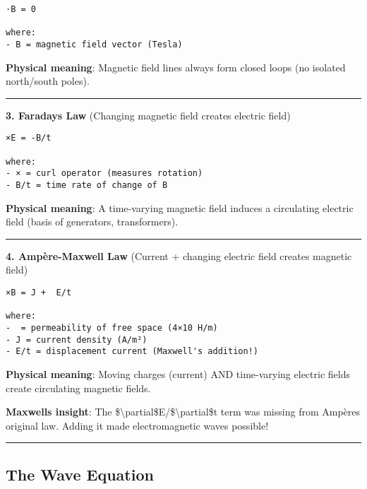 \begin{verbatim}
·B = 0

where:
- B = magnetic field vector (Tesla)
\end{verbatim}

\textbf{Physical meaning}: Magnetic field lines always form closed loops
(no isolated north/south poles).

\begin{center}\rule{0.5\linewidth}{0.5pt}\end{center}

\textbf{3. Faraday\textquotesingle s Law} (Changing magnetic field
creates electric field)

\begin{verbatim}
×E = -B/t

where:
- × = curl operator (measures rotation)
- B/t = time rate of change of B
\end{verbatim}

\textbf{Physical meaning}: A time-varying magnetic field induces a
circulating electric field (basis of generators, transformers).

\begin{center}\rule{0.5\linewidth}{0.5pt}\end{center}

\textbf{4. Ampère-Maxwell Law} (Current + changing electric field
creates magnetic field)

\begin{verbatim}
×B = J +  E/t

where:
-  = permeability of free space (4×10 H/m)
- J = current density (A/m²)
- E/t = displacement current (Maxwell's addition!)
\end{verbatim}

\textbf{Physical meaning}: Moving charges (current) AND time-varying
electric fields create circulating magnetic fields.

\textbf{Maxwell\textquotesingle s insight}: The
\$\textbackslash partial\$E/\$\textbackslash partial\$t term was missing
from Ampère\textquotesingle s original law. Adding it made
electromagnetic waves possible!

\begin{center}\rule{0.5\linewidth}{0.5pt}\end{center}

\subsection{\texorpdfstring{ The Wave
Equation}{ The Wave Equation}}\label{the-wave-equation}

